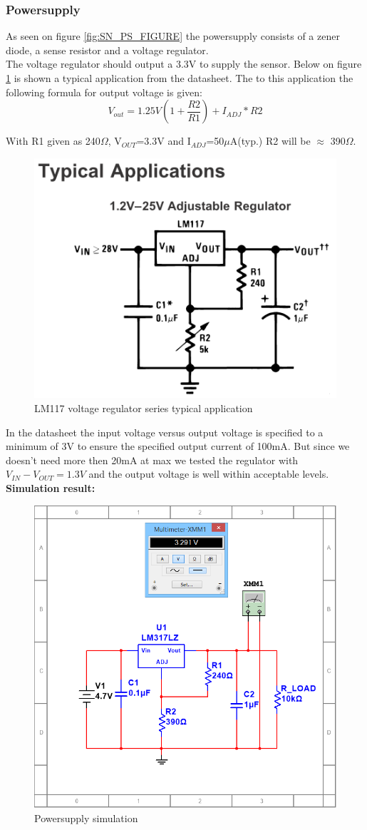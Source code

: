 \subsubsection{Powersupply}
As seen on figure \ref{fig:SN_PS_FIGURE} the powersupply consists of a zener diode, a sense resistor and a voltage regulator.\\
The voltage regulator should output a 3.3V to supply the sensor. Below on figure \ref{fig:LM317} is shown a typical application from the datasheet. The to this application the following formula for output voltage is given:\\
\begin{equation}
	V_{out}=1.25V\left(1+\frac{R2}{R1}\right)+ I_{ADJ}*R2
\end{equation}

With R1 given as 240$\Omega$, V$_{OUT}$=3.3V and I$_{ADJ}$=50$\mu$A(typ.) R2 will be $\approx$ 390$\Omega$.


\begin{figure}[H]
	\centering
	\includegraphics[width=.5\textwidth]{billeder/LM317}
	\caption{LM117 voltage regulator series typical application}
	\label{fig:LM317}
\end{figure}

In the datasheet the input voltage versus output voltage is specified to a minimum of 3V to ensure the specified output current of 100mA. But since we doesn't need more then 20mA at max we tested the regulator with $V_{IN}-V_{OUT}=1.3V$ and the output voltage is well within acceptable levels.\\

\textbf{Simulation result:}\\

\begin{figure}[H]
	\centering
	\includegraphics[width=.5\textwidth]{billeder/PS_lm317_sim}
	\caption{Powersupply simulation}
	\label{fig:ps_sim}
\end{figure}



